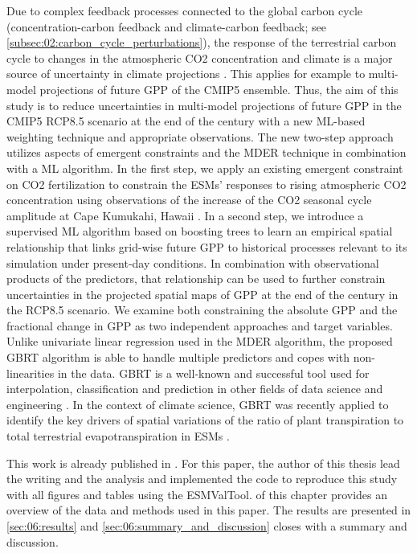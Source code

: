 Due to complex feedback processes connected to the global carbon cycle
(concentration-carbon feedback and climate-carbon feedback; see
\cref{subsec:02:carbon_cycle_perturbations}), the response of the terrestrial
carbon cycle to changes in the atmospheric \ac{CO2} concentration and climate
is a major source of uncertainty in climate projections \autocite{Bodman2013,
  Booth2012, Collins2013}. This applies for example to multi-model projections
of future \ac{GPP} of the \acs{CMIP}5 ensemble. Thus, the aim of this study is
to reduce uncertainties in multi-model projections of future \ac{GPP} in the
\acs{CMIP}5 \acs{RCP}8.5 scenario at the end of the  century with a new
\ac{ML}-based weighting technique and appropriate observations. The new
two-step approach utilizes aspects of emergent constraints and the \ac{MDER}
technique in combination with a \ac{ML} algorithm. In the first step, we apply
an existing emergent constraint on \ac{CO2} fertilization \autocite{Wenzel2016}
to constrain the \acp{ESM}' responses to rising atmospheric \ac{CO2}
concentration using observations of the increase of the \ac{CO2} seasonal cycle
amplitude at Cape Kumukahi, Hawaii \autocite{Keeling2005}. In a second step, we
introduce a supervised \ac{ML} algorithm based on boosting trees
\autocite{Friedman2001} to learn an empirical spatial relationship that links
grid-wise future \ac{GPP} to historical processes relevant to its simulation
under present-day conditions. In combination with observational products of the
predictors, that relationship can be used to further constrain uncertainties in
the projected spatial maps of \ac{GPP} at the end of the  century in
the \acs{RCP}8.5 scenario. We examine both constraining the absolute \ac{GPP}
and the fractional change in \ac{GPP} as two independent approaches and target
variables. Unlike univariate linear regression used in the \ac{MDER} algorithm,
the proposed \ac{GBRT} algorithm is able to handle multiple predictors and
copes with non-linearities in the data. \ac{GBRT} is a well-known and
successful tool used for interpolation, classification and prediction in other
fields of data science and engineering \autocite{Death2007, Elith2008}. In the
context of climate science, \ac{GBRT} was recently applied to identify the key
drivers of spatial variations of the ratio of plant transpiration to total
terrestrial evapotranspiration in \acp{ESM} \autocite{Lian2018}.

This work is already published in \textcite{Schlund2020}. For this paper, the
author of this thesis lead the writing and the analysis and implemented the
code to reproduce this study with all figures and tables using the
\ac{ESMValTool}.  of this chapter provides an
overview of the data and methods used in this paper. The results are presented
in \cref{sec:06:results} and \cref{sec:06:summary_and_discussion} closes with a
summary and discussion.


